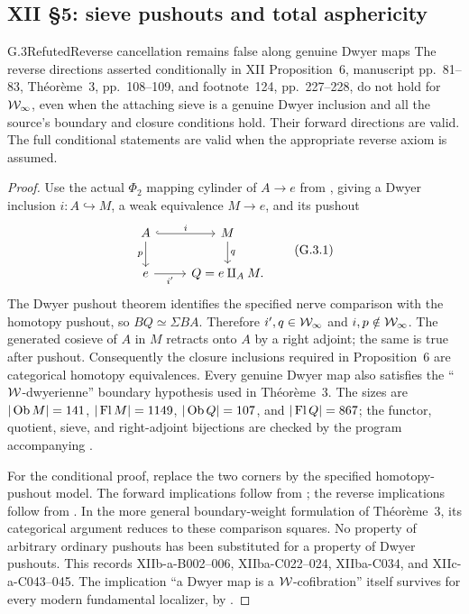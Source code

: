 \subsection{XII \S5: sieve pushouts and total asphericity}

\begin{claim}{G.3}{Refuted}{Reverse cancellation remains false along genuine Dwyer maps}
The reverse directions asserted conditionally in XII Proposition~6, manuscript pp.~81--83, Th\'eor\`eme~3, pp.~108--109, and footnote~124, pp.~227--228, do not hold for $\mathcal{W}_{\infty}$, even when the attaching sieve is a genuine Dwyer inclusion and all the source's boundary and closure conditions hold. Their forward directions are valid. The full conditional statements are valid when the appropriate reverse axiom is assumed.
\end{claim}
\begin{proof}
Use the actual $\Phi _2$ mapping cylinder of $A\to e$ from , giving a Dwyer inclusion $i:A\hookrightarrow M$, a weak equivalence $M\to e$, and its pushout
\[
\begin{tikzcd}
A\ar[r,hook,"i"]\ar[d,"p"']&M\ar[d,"q"]\\
e\ar[r,"i'"']&Q=e\amalg_A M.
\end{tikzcd}                                                   \tag{G.3.1}
\]
The Dwyer pushout theorem identifies the specified nerve comparison with the homotopy pushout, so $BQ\simeq\Sigma BA$. Therefore $i',q\in\mathcal{W}_{\infty}$ and $i,p\notin\mathcal{W}_{\infty}$. The generated cosieve of $A$ in $M$ retracts onto $A$ by a right adjoint; the same is true after pushout. Consequently the closure inclusions required in Proposition~6 are categorical homotopy equivalences. Every genuine Dwyer map also satisfies the ``$\mathcal{W}$-dwyerienne'' boundary hypothesis used in Th\'eor\`eme~3. The sizes are $|\operatorname{Ob} M|=141$, $|\operatorname{Fl} M|=1149$, $|\operatorname{Ob} Q|=107$, and $|\operatorname{Fl} Q|=867$; the functor, quotient, sieve, and right-adjoint bijections are checked by the program accompanying .

For the conditional proof, replace the two corners by the specified homotopy-pushout model. The forward implications follow from ; the reverse implications follow from . In the more general boundary-weight formulation of Th\'eor\`eme~3, its categorical argument reduces to these comparison squares. No property of arbitrary ordinary pushouts has been substituted for a property of Dwyer pushouts. This records XIIb-a-B002--006, XIIba-C022--024, XIIba-C034, and XIIc-a-C043--045. The implication ``a Dwyer map is a $\mathcal{W}$-cofibration'' itself survives for every modern fundamental localizer, by .
\end{proof}

